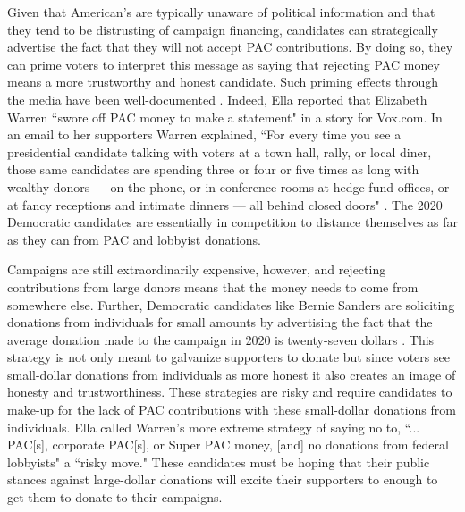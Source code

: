 \documentclass[12pt]{article}
\begin{document}
 Given that American's are typically unaware of political information and that they tend to be distrusting of campaign financing, candidates can strategically advertise the fact that they will not accept PAC contributions. By doing so, they can prime voters to interpret this message as saying that rejecting PAC money means a more trustworthy and honest candidate. Such priming effects through the media have been well-documented \citep{iyengar_news_1989}. Indeed, Ella \citet{nilsen_race_2019} reported that Elizabeth Warren ``swore off PAC money to make a statement" in a story for Vox.com. In an email to her supporters Warren explained, ``For every time you see a presidential candidate talking with voters at a town hall, rally, or local diner, those same candidates are spending three or four or five times as long with wealthy donors — on the phone, or in conference rooms at hedge fund offices, or at fancy receptions and intimate dinners — all behind closed doors" \citep{nilsen_race_2019}. The 2020 Democratic candidates are essentially in competition to distance themselves as far as they can from PAC and lobbyist donations. 
 
 Campaigns are still extraordinarily expensive, however, and rejecting contributions from large donors means that the money needs to come from somewhere else. Further, Democratic candidates like Bernie Sanders are soliciting donations from individuals for small amounts by advertising the fact that the average donation made to the campaign in 2020 is twenty-seven dollars \citep{gambino_not_2019}. This strategy is not only meant to galvanize supporters to donate but since voters see small-dollar donations from individuals as more honest \citep{bowler_campaign_2016} it also creates an image of honesty and trustworthiness. These strategies are risky and require candidates to make-up for the lack of PAC contributions with these small-dollar donations from individuals. Ella \citet{nilsen_race_2019} called Warren's more extreme strategy of saying no to, ``... PAC[s], corporate PAC[s], or Super PAC money, [and] no donations from federal lobbyists" a ``risky move." These candidates must be hoping that their public stances against large-dollar donations will excite their supporters to enough to get them to donate to their campaigns.





\pagebreak
{}
%
\printbibliography
\pagebreak


\begin{appendices}



\end{appendices}
\end{document}
